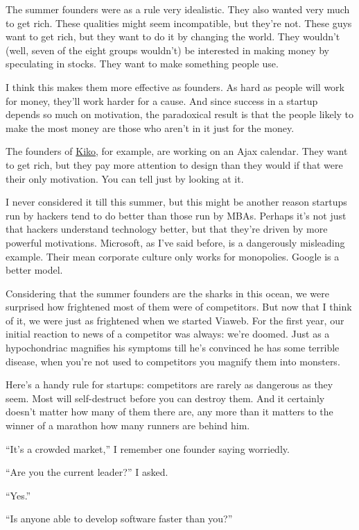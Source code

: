 The summer founders were as a rule very idealistic. They also wanted
very much to get rich. These qualities might seem incompatible, but
they're not. These guys want to get rich, but they want to do it by
changing the world. They wouldn't (well, seven of the eight groups
wouldn't) be interested in making money by speculating in stocks. They
want to make something people use.

I think this makes them more effective as founders. As hard as people
will work for money, they'll work harder for a cause. And since success
in a startup depends so much on motivation, the paradoxical result is
that the people likely to make the most money are those who aren't in it
just for the money.

The founders of \href{http://kiko.com}{Kiko}, for example, are working
on an Ajax calendar. They want to get rich, but they pay more attention
to design than they would if that were their only motivation. You can
tell just by looking at it.

I never considered it till this summer, but this might be another reason
startups run by hackers tend to do better than those run by MBAs.
Perhaps it's not just that hackers understand technology better, but
that they're driven by more powerful motivations. Microsoft, as I've
said before, is a dangerously misleading example. Their mean corporate
culture only works for monopolies. Google is a better model.

Considering that the summer founders are the sharks in this ocean, we
were surprised how frightened most of them were of competitors. But now
that I think of it, we were just as frightened when we started Viaweb.
For the first year, our initial reaction to news of a competitor was
always: we're doomed. Just as a hypochondriac magnifies his symptoms
till he's convinced he has some terrible disease, when you're not used
to competitors you magnify them into monsters.

Here's a handy rule for startups: competitors are rarely as dangerous as
they seem. Most will self-destruct before you can destroy them. And it
certainly doesn't matter how many of them there are, any more than it
matters to the winner of a marathon how many runners are behind him.

``It's a crowded market,'' I remember one founder saying worriedly.

``Are you the current leader?'' I asked.

``Yes.''

``Is anyone able to develop software faster than you?''

